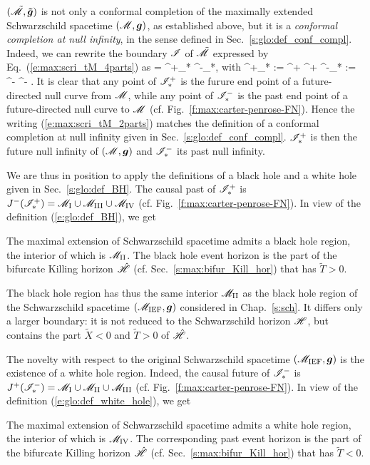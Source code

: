 $(\tilde{\mathscr{M}},\bm{\tilde{g}})$ is not only a conformal
completion of the maximally extended Schwarzschild spacetime $(\mathscr{M},\bm{g})$,
as established above, but it is a \emph{conformal completion at null infinity}, in the sense defined in Sec.~\ref{s:glo:def_conf_compl}.
Indeed, we can rewrite the boundary $\mathscr{I}$
of $\tilde{\mathscr{M}}$ expressed by Eq.~(\ref{e:max:scri_tM_4parts}) as
\be \label{e:max:scri_tM_2parts}
    \scri = \scri^+_* \cup \scri^-_*,
\ee
with
\be
    \scri^+_* := \scri^+ ^+ \qand
    \scri^-_* := \scri^- ^- .
\ee
It is clear that any point of $\mathscr{I}^+_*$ is the furure end point of a future-directed
null curve from $\mathscr{M}$, while any point of $\mathscr{I}^-_*$ is the past end point
of a future-directed null curve to $\mathscr{M}$
(cf. Fig.~\ref{f:max:carter-penrose-FN}). Hence the writing (\ref{e:max:scri_tM_2parts})
matches the definition of a conformal
completion at null infinity given in Sec.~\ref{s:glo:def_conf_compl}. $\mathscr{I}^+_*$ is then the future null infinity
of $(\mathscr{M}, \bm{g})$ and $\mathscr{I}^-_*$ its past null infinity.

We are thus in position to apply the definitions of a black hole and a white hole
given in Sec.~\ref{s:glo:def_BH}. The
causal past of $\mathscr{I}^+_*$ is $J^-(\mathscr{I}^+_*) = \mathscr{M}_{\rm I}\cup \mathscr{M}_{\rm III}\cup \mathscr{M}_{\rm IV}$
(cf. Fig.~\ref{f:max:carter-penrose-FN}). In view of the definition
(\ref{e:glo:def_BH}), we get
\begin{prop}
The maximal extension of Schwarzschild spacetime admits a black hole region,
the interior of which is $\mathscr{M}_{\rm II}$. The black hole event horizon is the
part of the bifurcate Killing horizon $\hat{\mathscr{H}}$ (cf. Sec.~\ref{s:max:bifur_Kill_hor})
that has $\tilde{T}>0$.
\end{prop}
The black hole region has thus the same interior $\mathscr{M}_{\rm II}$ as the black hole region
of the Schwarzschild spacetime $(\mathscr{M}_{\rm IEF}, \bm{g})$ considered in Chap.~\ref{s:sch}.
It differs only a larger boundary: it is not reduced to the Schwarzschild horizon $\mathscr{H}$,
but contains the part $\tilde{X}<0$ and $\tilde{T}>0$ of $\hat{\mathscr{H}}$.

The novelty with respect to the original Schwarzschild spacetime $(\mathscr{M}_{\rm IEF}, \bm{g})$
is the existence of a white hole region. Indeed, the causal future of $\mathscr{I}^-_*$ is
$J^+(\mathscr{I}^-_*) = \mathscr{M}_{\rm I}\cup \mathscr{M}_{\rm II}\cup \mathscr{M}_{\rm III}$
(cf. Fig.~\ref{f:max:carter-penrose-FN}). In view of the definition
(\ref{e:glo:def_white_hole}), we get
\begin{prop}
The maximal extension of Schwarzschild spacetime admits a white hole region,
the interior of which is $\mathscr{M}_{\rm IV}$. The corresponding past event horizon is the
part of the bifurcate Killing horizon $\hat{\mathscr{H}}$ (cf. Sec.~\ref{s:max:bifur_Kill_hor})
that has $\tilde{T}<0$.
\end{prop}

